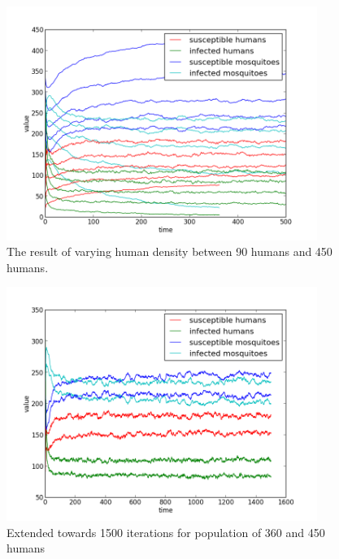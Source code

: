\documentclass[a4paper]{report}
\begin{document}
\begin{figure}[htbp]
    \centering
    \includegraphics[width=0.9\textwidth]{var_human_density_02_05_08_SECOND.png}
    \caption{The result of varying human density between 90 humans and 450 humans.}
    \label{fig:var_human}
\end{figure}


\begin{figure}[htbp]
    \centering
    \includegraphics[width=0.9\textwidth]{var_human_1500_SECOND.png}
    \caption{Extended towards 1500 iterations for population of 360 and 450
    humans}
    \label{fig:var_human_1500}
\end{figure}

\end{document}
